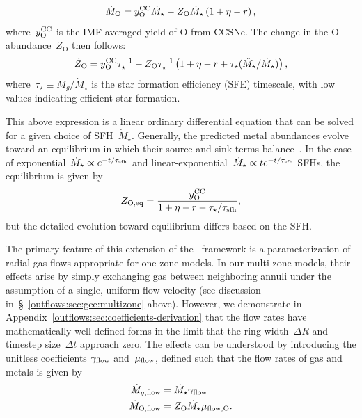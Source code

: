 \begin{equation}
\dot{M}_\text{O} = y_\text{O}^\text{CC} \dot{M}_\star - Z_\text{O} \dot{M}_\star
\left(1 + \eta - r\right),
\label{outflows:eq:mdot-element-noflow}
\end{equation}
where~$y_\text{O}^\text{CC}$ is the IMF-averaged yield of O from CCSNe.
The change in the O abundance~$\dot{Z}_\text{O}$ then follows:
\begin{equation}
\dot{Z}_\text{O} = y_\text{O}^\text{CC}\tau_\star^{-1} - Z_\text{O} \tau_\star^{-1}
\left(1 + \eta - r + \tau_\star (\ddot{M}_\star / \dot{M}_\star) \right),
\label{outflows:eq:zdot-noflow}
\end{equation}
where~$\tau_\star \equiv M_g / \dot{M}_\star$ is the star formation efficiency
(SFE) timescale, with low values indicating efficient star formation.
\par
This above expression is a linear ordinary differential equation that can
be solved for a given choice of SFH~$\dot{M}_\star$.
Generally, the predicted metal abundances evolve toward an equilibrium in
which their source and sink terms balance~\citep[see also][]{Larson1974}.
In the case of exponential~$\dot{M}_\star \propto e^{-t / \tau_\text{sfh}}$
and linear-exponential~$\dot{M}_\star \propto t e^{-t / \tau_\text{sfh}}$ SFHs,
the equilibrium is given by
\begin{equation}
Z_\text{O,eq} = \frac{y_\text{O}^\text{CC}}{1 + \eta - r - \tau_\star / \tau_\text{sfh}},
\label{outflows:eq:zo-eq-noflow}
\end{equation}
but the detailed evolution toward equilibrium differs based on the SFH.
\par
The primary feature of this extension of the~
framework is a parameterization of radial gas flows appropriate for one-zone
models.
In our multi-zone models, their effects arise by simply exchanging gas between
neighboring annuli under the assumption of a single, uniform flow velocity (see
discussion in~\S~\ref{outflows:sec:gce:multizone} above).
However, we demonstrate in Appendix~\ref{outflows:sec:coefficients-derivation}
that the flow rates have mathematically well defined forms in the limit that
the ring width~$\Delta R$ and timestep size~$\Delta t$ approach zero.
The effects can be understood by introducing the unitless coefficients
$\gamma_{\text{flow}}$ and~$\mu_{\text{flow}}$, defined such that the flow rates of
gas and metals is given by
\begin{subequations}\begin{align}
\dot{M}_{g,\text{flow}} &= \dot{M}_\star \gamma_{\text{flow}}
\label{outflows:eq:mdot-gas-flow}
\\
\dot{M}_\text{O,flow} &= Z_\text{O} \dot{M}_\star \mu_{\text{flow},\text{O}}.
\label{outflows:eq:mdot-element-flow}
\end{align}\end{subequations}
